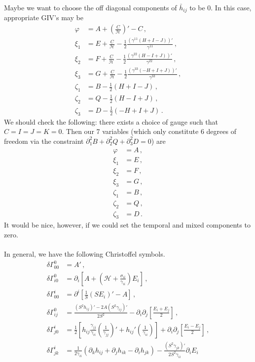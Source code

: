 \documentclass{article}
\newcommand*\scr[1]{\mathscr{#1}}
\newcommand*\p[1]{\left(#1\right)}
\newcommand*\ps[1]{\left[#1\right]}
\newcommand*\f[2]{\frac{#1}{#2}}
\begin{document}
Maybe we want to choose the off diagonal components of $\bar h_{ij}$ to be 0. In this case, appropriate GIV's may be
\begin{align}
\varphi&=A+\p{\f{C}{\scr H}}'-C\,,\\
\xi_1&=E+\f{C}{\scr H}-\f12\f{(\gamma^{11}(H+I-J))'}{\gamma^{11}}\,,\\
\xi_2&=F+\f{C}{\scr H}-\f12\f{(\gamma^{22}(H-I+J))'}{\gamma^{22}}\,,\\
\xi_3&=G+\f{C}{\scr H}-\f12\f{(\gamma^{33}(-H+I+J))'}{\gamma^{33}}\,,\\
\zeta_1&=B-\f12(H+I-J)\,,\\
\zeta_2&=Q-\f12(H-I+J)\,,\\
\zeta_3&=D-\f12(-H+I+J)\,.
\end{align}
We should check the following: there exists a choice of gauge such that $C=I=J=K=0$. Then our 7 variables (which only constitute 6 degrees of freedom via the constraint $\partial_{1}^{2}B+\partial_{2}^{2}Q+\partial_{3}^{2}D=0$) are
\begin{align}
\varphi&=A\,,\\
\xi_1&=E\,,\\
\xi_2&=F\,,\\
\xi_3&=G\,,\\
\zeta_1&=B\,,\\
\zeta_2&=Q\,,\\
\zeta_3&=D\,.
\end{align}
It would be nice, however, if we could set the temporal and mixed components to zero.
\\\\
In general, we have the following Christoffel symbols.
\begin{align}
\delta\Gamma^0_{00}&=A'\,,\\
\delta\Gamma^0_{i0}&=\partial_i\ps{A+\p{\scr H+\f{\sigma_{ii}}{\gamma_{ii}}}E_i}\,,\\
\delta\Gamma^i_{00}&=\partial^i\ps{\f1S\p{SE_i}'-A}\,,\\
\delta\Gamma^0_{ij}&=\f{\p{S^2 h_{ij}}'-2A\p{S^2\gamma_{ij}}'}{2S^2}-\partial_i\partial_j\ps{\f{E_i+E_j}{2}}\,,\\
\delta\Gamma^i_{j0}&=\f12\ps{h_{ij}\f{\gamma_{jj}}{\gamma_{ii}}\p{\f{1}{\gamma_{jj}}}'+h_{ij}'\p{\f{1}{\gamma_{ii}}}}+\partial_i\partial_j\ps{\f{E_i-E_j}{2}}\,,\\
\delta\Gamma^i_{jk}&=\f{1}{2\gamma_{ii}}\p{\partial_k h_{ij}+\partial_j h_{ik}-\partial_i h_{jk}}-\f{(S^2\gamma_{jk})'}{2S^2\gamma_{ii}}\partial_i E_i
\end{align}
\end{document}
